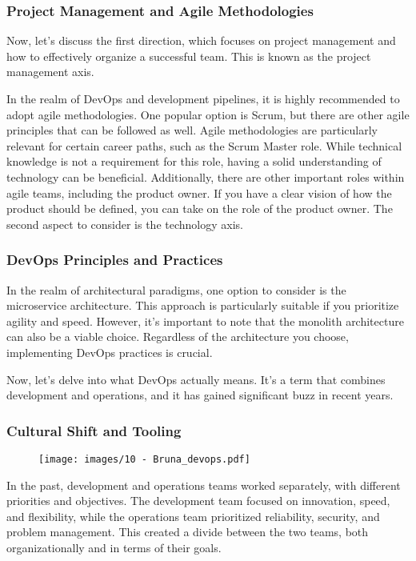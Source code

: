\subsubsection{Project Management and Agile Methodologies}

Now, let's discuss the first
direction, which focuses on project management and how to effectively
organize a successful team. This is known as the project management
axis.

In the realm of DevOps and development pipelines, it is highly
recommended to adopt agile methodologies. One popular option is Scrum,
but there are other agile principles that can be followed as well. Agile
methodologies are particularly relevant for certain career paths, such
as the Scrum Master role. While technical knowledge is not a requirement
for this role, having a solid understanding of technology can be
beneficial. Additionally, there are other important roles within agile
teams, including the product owner. If you have a clear vision of how
the product should be defined, you can take on the role of the product
owner. The second aspect to consider is the technology axis.

\subsubsection{DevOps Principles and Practices}

In the realm of architectural paradigms, one option to consider is the
microservice architecture. This approach is particularly suitable if you
prioritize agility and speed. However, it's important to note that the
monolith architecture can also be a viable choice. Regardless of the
architecture you choose, implementing DevOps practices is crucial.

Now, let's delve into what DevOps actually means. It's a term that
combines development and operations, and it has gained significant buzz
in recent years.

\subsubsection{Cultural Shift and Tooling}

\begin{figure}[!h]
  \centering
  \texttt{[image: images/10 - Bruna\_devops.pdf]}
\end{figure}

In the past, development and operations teams worked separately, with
different priorities and objectives. The development team focused on
innovation, speed, and flexibility, while the operations team
prioritized reliability, security, and problem management. This created
a divide between the two teams, both organizationally and in terms of
their goals.

